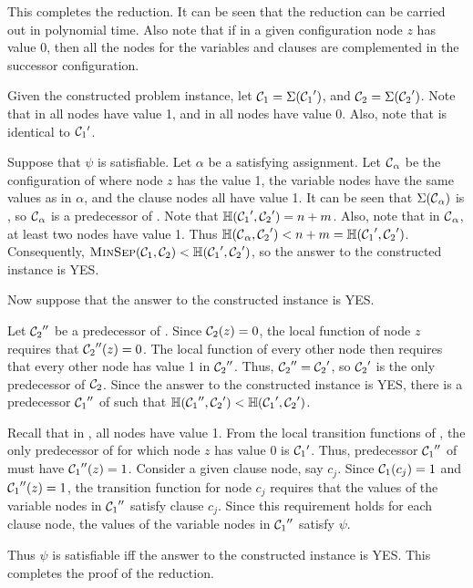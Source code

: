 This completes the reduction. It can be seen that the reduction
can be carried out in polynomial time.
Also note that if in a given configuration node $z$ has value 0, 
then all the nodes for the variables and clauses 
are complemented in the successor configuration.

Given the constructed \mpsgp{} problem instance,
let $\mbox{$\mathcal{C}_{1}$} = \Sigma(\mbox{$\mathcal{C}_{1}$}')$, and $\mbox{$\mathcal{C}_{2}$} = \Sigma(\mbox{$\mathcal{C}_{2}$}')$.
Note that in \calcone{} all nodes have value 1,
and in \calctwo{} all nodes have value 0.
Also, note that \calctwo{} is identical to $\mbox{$\mathcal{C}_{1}$}{}'$.

Suppose that $\psi$ is satisfiable.
Let $\alpha$ be a satisfying assignment.
Let $\mbox{$\mathcal{C}$}_{\alpha}$ be the configuration of  \cals{}
where node $z$ has the value 1,
the variable nodes have the same values as in $\alpha$,
and the clause nodes all have value 1.
It can be seen that $\Sigma(\mbox{$\mathcal{C}$}_{\alpha})$ is \calcone{},
so $\mbox{$\mathcal{C}$}_{\alpha}$ is a predecessor of \calcone{}.
Note that $\mbox{$\mathbb{H}$}(\mbox{$\mathcal{C}_{1}$}', \mbox{$\mathcal{C}_{2}$}') = n+m$.
Also, note that in $\mbox{$\mathcal{C}$}_{\alpha}$, at least two nodes have value 1.
Thus $\mbox{$\mathbb{H}$}(\mbox{$\mathcal{C}$}_{\alpha}, \mbox{$\mathcal{C}_{2}$}') < n+m  = \mbox{$\mathbb{H}$}(\mbox{$\mathcal{C}_{1}$}', \mbox{$\mathcal{C}_{2}$}')$.
Consequently, 
$\mbox{\textsc{MinSep}}(\mbox{$\mathcal{C}_{1}$}, \mbox{$\mathcal{C}_{2}$}) < \mbox{$\mathbb{H}$}(\mbox{$\mathcal{C}_{1}$}', \mbox{$\mathcal{C}_{2}$}')$,
so the answer to the constructed \mpsgp{} instance is YES.

Now suppose that the answer to the constructed \mpsgp{} instance is YES.

Let $\mbox{$\mathcal{C}_{2}$}''$ be a predecessor of \calctwo{}.
Since $\mbox{$\mathcal{C}_{2}$}(z) = 0$, the local function of node $z$ requires that 
$\mbox{$\mathcal{C}_{2}$}''(z) = 0$.
The local function of every other node then requires that 
every other node has value 1 in  $\mbox{$\mathcal{C}_{2}$}''$.
Thus,  $\mbox{$\mathcal{C}_{2}$}'' = \mbox{$\mathcal{C}_{2}$}'$,
so $\mbox{$\mathcal{C}_{2}$}'$ is the only predecessor of $\mbox{$\mathcal{C}_{2}$}$.
Since the answer to the constructed \mpsgp{} instance is YES,
there is  a predecessor $\mbox{$\mathcal{C}_{1}$}''$ of \calcone{} such that
$\mbox{$\mathbb{H}$}(\mbox{$\mathcal{C}_{1}$}'', \mbox{$\mathcal{C}_{2}$}') < \mbox{$\mathbb{H}$}(\mbox{$\mathcal{C}_{1}$}', \mbox{$\mathcal{C}_{2}$}')$.


Recall that in \calcone{}, all nodes have value 1.
From the local transition functions of \cals{}, 
the only predecessor of \calcone{} for which node $z$ has value 0 is $\mbox{$\mathcal{C}_{1}$}{}'$.
Thus, predecessor $\mbox{$\mathcal{C}_{1}$}''$ of \calcone{}
must have $\mbox{$\mathcal{C}_{1}$}''(z) = 1$.
Consider a given clause node, say $c_j$.
Since $\mbox{$\mathcal{C}_{1}$}(c_j) = 1$ and $\mbox{$\mathcal{C}_{1}$}''(z) = 1$,
the transition function for node $c_j$ requires that
the values of the variable nodes in $\mbox{$\mathcal{C}_{1}$}''$ satisfy clause $c_j$.
Since this requirement holds for each clause node,
the values of the variable nodes in $\mbox{$\mathcal{C}_{1}$}''$ satisfy $\psi$.

Thus $\psi$ is satisfiable iff the answer to the constructed \mpsgp{} instance is YES.
This completes the proof of the reduction.
\QED